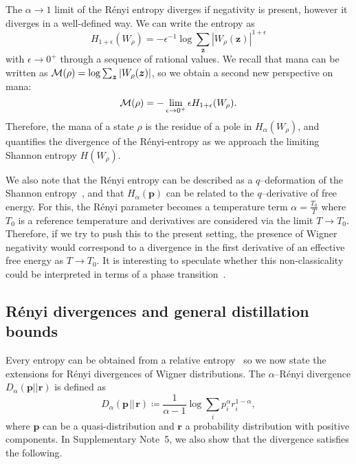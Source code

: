 \documentclass[
onecolumn,
superscriptaddress
]{revtex4-1}
\def\z{\boldsymbol{z}}
\def\r{\boldsymbol{r}}
\def\p{\boldsymbol{p}}
\def\M{{\cal M}}
\begin{document}
The $\alpha \rightarrow 1$ limit of the R\'{e}nyi entropy diverges if negativity is present, however it diverges in a well-defined way. We can write the entropy as 
\begin{equation}
	H_{1+\epsilon}(W_\rho) = -\epsilon^{-1} \log \sum_{\z} |W_\rho (\z)|^{1+\epsilon}
\end{equation} 
with $\epsilon \rightarrow 0^+$ through a sequence of rational values. We recall that mana can be written as $\M(\rho) = \log \sum_{\z} |W_\rho(\z)|$, so we obtain a second new perspective on mana:
\begin{equation}\label{eq:mana-divergence}
\M(\rho) = -\lim_{\epsilon \rightarrow 0^+} \epsilon H_{1+\epsilon}(W_\rho).
\end{equation}
Therefore, the mana of a state $\rho$ is the residue of a pole in $H_\alpha(W_\rho)$, and quantifies the divergence of the R\'{e}nyi-entropy as we approach the limiting Shannon entropy $H(W_\rho)$. 

We also note that the R\'{e}nyi entropy can be described as a $q$--deformation of the Shannon entropy~\cite{baez2011renyi}, and that $H_\alpha(\p)$ can be related to the $q$--derivative of free energy.  For this, the R\'{e}nyi parameter becomes a temperature term $\alpha = \frac{T_0}{T}$ where $T_0$ is a reference temperature and derivatives are considered via the limit $T \rightarrow T_0$. Therefore, if we try to push this to the present setting, the presence of Wigner negativity would correspond to a divergence in the first derivative of an effective free energy as $T \rightarrow T_0$. It is interesting to speculate whether this non-classicality could be interpreted in terms of a phase transition~\cite{domb2000phase}.

\subsection*{R\'{e}nyi divergences and general distillation bounds}
Every entropy can be obtained from a relative entropy~\cite{Gour_2020} so we now state the extensions for R\'{e}nyi divergences of Wigner distributions.
The $\alpha$--R\'{e}nyi divergence $D_\alpha(\p||\r)$ is defined as
\begin{equation}\label{eq:D}
	D_\alpha(\p \hspace{1pt}||\hspace{1pt} \r) \coloneqq \frac{1}{\alpha-1} \log \sum_i p_i^\alpha r_i^{1-\alpha},
\end{equation}
where $\p$ can be a quasi-distribution and $\r$ a probability distribution with positive components. In Supplementary Note~5, we also show that the divergence satisfies the following.
\end{document}

